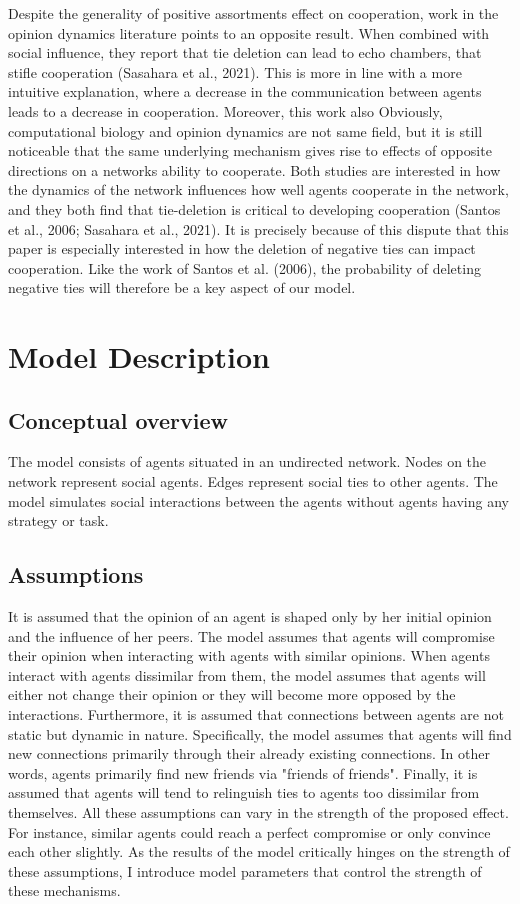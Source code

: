 \documentclass{article}
\begin{document}
Despite the generality of positive assortments effect on cooperation, work in the opinion dynamics literature points to an opposite result. When combined with social influence, they report that tie deletion can lead to echo chambers, that stifle cooperation (Sasahara et al., 2021). This is more in line with a more intuitive explanation, where a decrease in the communication between agents leads to a decrease in cooperation. Moreover, this work also Obviously, computational biology and opinion dynamics are not same field, but it is still noticeable that the same underlying mechanism gives rise to effects of opposite directions on a networks ability to cooperate. Both studies are interested in how the dynamics of the network influences how well agents cooperate in the network, and they both find that tie-deletion is critical to developing cooperation (Santos et al., 2006; Sasahara et al., 2021). It is precisely because of this dispute that this paper is especially interested in how the deletion of negative ties can impact cooperation. Like the work of Santos et al. (2006), the probability of deleting negative ties will therefore be a key aspect of our model.  


\section{Model Description}
\subsection{Conceptual overview}
The model consists of agents situated in an undirected network. Nodes on the network represent social agents. Edges represent social ties to other agents. 
The model simulates social interactions between the agents without agents having any strategy or task. 

\subsection{Assumptions}
It is assumed that the opinion of an agent is shaped only by her initial opinion and the influence of her peers. 
The model assumes that agents will compromise their opinion when interacting with agents with similar opinions. 
When agents interact with agents dissimilar from them, the model assumes that agents will either not change their opinion or they will become more opposed by the interactions.
Furthermore, it is assumed that connections between agents are not static but dynamic in nature. 
Specifically, the model assumes that agents will find new connections primarily through their already existing connections. In other words, 
agents primarily find new friends via "friends of friends". Finally, it is assumed that agents will tend to relinguish ties to agents too dissimilar from themselves.
All these assumptions can vary in the strength of the proposed effect. For instance, similar agents could reach a perfect compromise or only convince each other slightly. 
As the results of the model critically hinges on the strength of these assumptions, I introduce model parameters that control the strength of these mechanisms.
\end{document}
